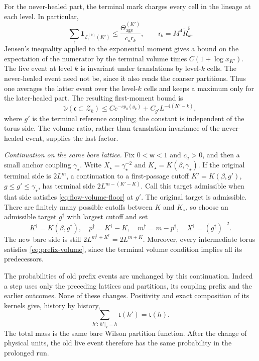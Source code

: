 \documentclass[11pt,letterpaper,reqno]{amsart}
\theoremstyle{definition}
\theoremstyle{remark}
\begin{document}
For the never-healed part, the terminal mark charges every cell
in the lineage at each level. In particular,
\[
 \sum_{\mathfrak c}
    \mathbf1_{\mathcal E_{\mathfrak c}^{(k)}(K')}
       \le \frac{\Theta_{\mathrm{age}}^{(K')}}
                    {c_a\mathsf r_k},
       \qquad \mathsf r_k=M^4\check R_k^5.
\]
Jensen's inequality applied to the exponential moment gives a
bound on the expectation of the numerator by the terminal volume
times $C(1+\log x_{K'})$. The live event at level $k$ is invariant
under translations by level-$k$ cells. The never-healed event need
not be, since it also reads the coarser partitions. Thus one averages
the latter event over the level-$k$ cells and keeps a maximum only
for the later-healed part. The resulting first-moment bound is
\begin{equation}\label{eq:xrg-live-first-moment}
 \widetilde\nu(\mathfrak c\subset\mathcal Z_k)
 \le Ce^{-cp_0(g_k)}+C_{g'}L^{-4(K'-k)},
\end{equation}
where $g'$ is the terminal reference coupling; the constant is
independent of the torus side. The volume ratio, rather than
translation invariance of the never-healed event, supplies the
last factor.

\emph{Continuation on the same bare lattice.}
Fix \(0<\mathsf w<1\) and \(c_a>0\), and then a small anchor
coupling \(\gamma_\star\). Write \(X_\star=\gamma_\star^{-2}\)
and \(K_\star=K(\beta,\gamma_\star)\). If the original terminal
side is \(2L^m\), a continuation to a first-passage cutoff
\(K'=K(\beta,g')\), \(g\le g'\le\gamma_\star\), has terminal
side \(2L^{m-(K'-K)}\). Call this target admissible when
that side satisfies \eqref{eq:flow-volume-floor} at \(g'\).
The original target is admissible. There are finitely many
possible cutoffs between \(K\) and \(K_\star\), so choose an
admissible target \(g^\dagger\) with largest cutoff and set
\[
 K^\dagger=K(\beta,g^\dagger),\quad
 p^\dagger=K^\dagger-K,\quad
 m^\dagger=m-p^\dagger,\quad
 X^\dagger=(g^\dagger)^{-2}.
\]
The new bare side is still \(2L^{m^\dagger+K^\dagger}
=2L^{m+K}\). Moreover, every intermediate torus satisfies
\eqref{eq:prefix-volume}, since the terminal volume condition
implies all its predecessors.

The probabilities of old prefix events are unchanged by
this continuation. Indeed a step uses only the preceding
lattices and partitions, its coupling prefix and the earlier
outcomes. None of these changes. Positivity and exact
composition of its kernels give, history by history,
\[
 \sum_{h':\,h'|_k=h}\mathsf t(h')=\mathsf t(h).
\]
The total mass is the same bare Wilson partition function.
After the change of physical units, the old live event
therefore has the same probability in the prolonged run.
\end{document}
